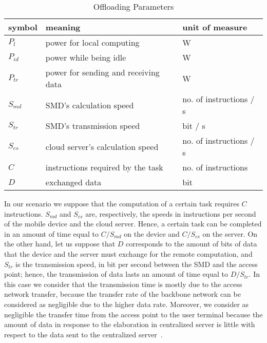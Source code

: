 \documentclass[twoside,openright]{report}
\begin{document}
	\begin{table}[tbp]
	\renewcommand{\arraystretch}{2}
	\begin{center}
	\caption{Offloading Parameters}
	\label{tab:parameters}
	{
	\begin{tabular}{l|p{2.5in}|p{2in}}\hline\hline
	{symbol}& {meaning}& {unit of measure}\\ \hline
	 
	$P_{l}$      &  power for local computing& W\\ 
	$P_{\textit{id}}$      &  power while being idle& W\\ 
	$P_{\textit{tr}}$      &  power for sending and receiving data& W\\ 
	 
	$S_{\textit{md}}$      &  SMD's calculation speed & no. of instructions / s\\ 
	$S_{\textit{tr}}$      &  SMD's transmission speed  & bit / s\\
	$S_{\textit{cs}}$      &  cloud server's calculation speed & no. of instructions / s\\ 
	
	$C$      &  instructions required by the task  & no. of instructions\\ 
	$D$      &  exchanged data  & bit\\ \hline
	\end{tabular}
	}
	\end{center}
	\end{table}
In our scenario we suppose that the computation of a certain task requires $C$ instructions.
 $S_{\textit{md}}$ and $S_{\textit{cs}}$ are, respectively, the speeds in instructions per second of the mobile device and the cloud server. 
Hence, a certain task can be completed in an amount of time equal to $C/S_{\textit{md}}$ on the device and $C/S_{\textit{cs}}$ on the server. 
On the other hand, let us suppose that $D$ corresponds to the amount of bits of data that the device and the server must exchange for the remote computation, and $S_{\textit{tr}}$ is the transmission speed, in bit per second between the \gls{SMD} and the access point; hence, the transmission of data lasts an amount of time equal to $D/S_{\textit{tr}}$. 
In this case we consider that the transmission time is mostly due to the access network transfer, because the transfer rate of the backbone network can be considered as negligible due to the higher data rate.
Moreover, we consider as negligible the transfer time from the access point to the user terminal because the amount of data in response to the elaboration in centralized server is little with respect to the data sent to the centralized server~\cite{Kumar,Tradeoff}.
\end{document}
